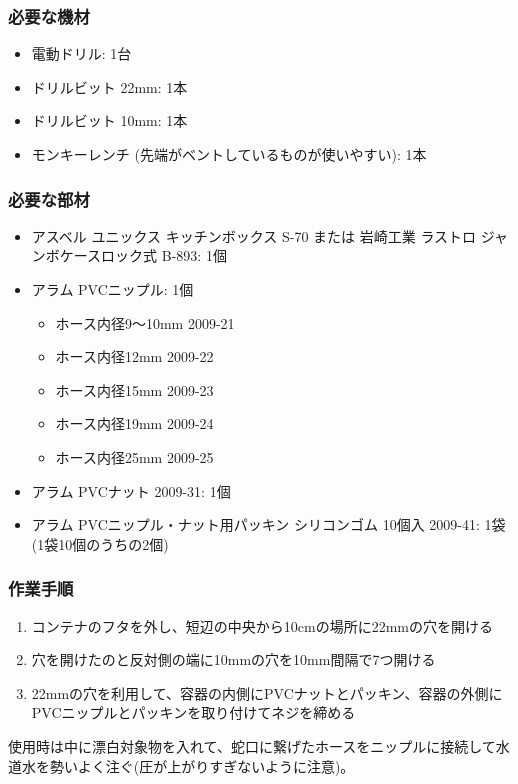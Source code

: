 \documentclass[titlepage,10pt,a4paper,uplatex]{jsbook}
\begin{document}
\subsubsection{必要な機材}
\begin{itemize}
\item 電動ドリル: 1台
\item ドリルビット 22mm: 1本
\item ドリルビット 10mm: 1本
\item モンキーレンチ (先端がベントしているものが使いやすい): 1本
\end{itemize}

\subsubsection{必要な部材}
\begin{itemize}
\item アスベル ユニックス キッチンボックス S-70 または 岩崎工業 ラストロ ジャンボケースロック式 B-893: 1個
\item アラム PVCニップル: 1個
\begin{itemize}
\item ホース内径9～10mm 2009-21
\item ホース内径12mm 2009-22
\item ホース内径15mm 2009-23
\item ホース内径19mm 2009-24
\item ホース内径25mm 2009-25
\end{itemize}
\item アラム PVCナット 2009-31: 1個
\item アラム PVCニップル・ナット用パッキン シリコンゴム 10個入 2009-41: 1袋 (1袋10個のうちの2個)
\end{itemize}

\subsubsection{作業手順}
\begin{enumerate}
\item コンテナのフタを外し、短辺の中央から10cmの場所に22mmの穴を開ける
\item 穴を開けたのと反対側の端に10mmの穴を10mm間隔で7つ開ける
\item 22mmの穴を利用して、容器の内側にPVCナットとパッキン、容器の外側にPVCニップルとパッキンを取り付けてネジを締める
\end{enumerate}

使用時は中に漂白対象物を入れて、蛇口に繋げたホースをニップルに接続して水道水を勢いよく注ぐ(圧が上がりすぎないように注意)。
\end{document}
